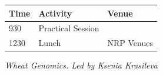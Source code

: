 \documentclass[12pt,]{book}
\begin{document}
\begin{longtable}[]{@{}lll@{}}
\toprule
\begin{minipage}[b]{0.09\columnwidth}\raggedright\strut
Time\strut
\end{minipage} & \begin{minipage}[b]{0.23\columnwidth}\raggedright\strut
Activity\strut
\end{minipage} & \begin{minipage}[b]{0.13\columnwidth}\raggedright\strut
Venue\strut
\end{minipage}\tabularnewline
\midrule
\endhead
\begin{minipage}[t]{0.09\columnwidth}\raggedright\strut
930\strut
\end{minipage} & \begin{minipage}[t]{0.23\columnwidth}\raggedright\strut
Practical Session\strut
\end{minipage} & \begin{minipage}[t]{0.13\columnwidth}\raggedright\strut
\strut
\end{minipage}\tabularnewline
\begin{minipage}[t]{0.09\columnwidth}\raggedright\strut
1230\strut
\end{minipage} & \begin{minipage}[t]{0.23\columnwidth}\raggedright\strut
Lunch\strut
\end{minipage} & \begin{minipage}[t]{0.13\columnwidth}\raggedright\strut
NRP Venues\strut
\end{minipage}\tabularnewline
\bottomrule
\end{longtable}

\emph{Wheat Genomics. Led by Ksenia Krasileva}
\end{document}
